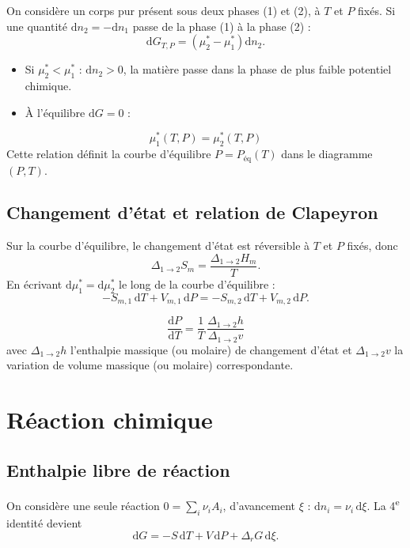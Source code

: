 \documentclass[11pt,a4paper]{article}
\newcommand{\dd}{\mathrm{d}}
\newcommand{\rG}{\Delta_r G}
\begin{document}
On considère un corps pur présent sous deux phases (1) et (2), à $T$ et $P$
fixés. Si une quantité $\dd n_2 = -\dd n_1$ passe de la phase (1) à la phase (2) :
\[
  \dd G_{T,P} = \left(\mu_2^* - \mu_1^*\right)\dd n_2 .
\]
\begin{itemize}[nosep]
  \item Si $\mu_2^* < \mu_1^*$ : $\dd n_2 > 0$, la matière passe dans la phase de
        plus faible potentiel chimique.
  \item À l'équilibre $\dd G = 0$ :
\end{itemize}
\begin{resultat}[title={Équilibre diphasé}]
\[
  \mu_1^*(T,P) = \mu_2^*(T,P)
\]
Cette relation définit la courbe d'équilibre $P = P_{\text{éq}}(T)$ dans le
diagramme $(P,T)$.
\end{resultat}

\subsection{Changement d'état et relation de Clapeyron}

Sur la courbe d'équilibre, le changement d'état est réversible à $T$ et $P$
fixés, donc
\[
  \Delta_{1\to2} S_m = \frac{\Delta_{1\to2} H_m}{T} .
\]
En écrivant $\dd\mu_1^* = \dd\mu_2^*$ le long de la courbe d'équilibre :
\[
  -S_{m,1}\,\dd T + V_{m,1}\,\dd P = -S_{m,2}\,\dd T + V_{m,2}\,\dd P .
\]

\begin{resultat}[title={Relation de Clapeyron}]
\[
  \frac{\dd P}{\dd T} = \frac{1}{T}\,\frac{\Delta_{1\to2} h}{\Delta_{1\to2} v}
\]
avec $\Delta_{1\to2}h$ l'enthalpie massique (ou molaire) de changement d'état et
$\Delta_{1\to2}v$ la variation de volume massique (ou molaire) correspondante.
\end{resultat}

\section{Réaction chimique}

\subsection{Enthalpie libre de réaction}

On considère une seule réaction $0 = \sum_i \nu_i A_i$, d'avancement $\xi$ :
$\dd n_i = \nu_i\,\dd\xi$. La 4\textsuperscript{e} identité devient
\[
  \dd G = -S\,\dd T + V\,\dd P + \rG\,\dd\xi .
\]
\end{document}
